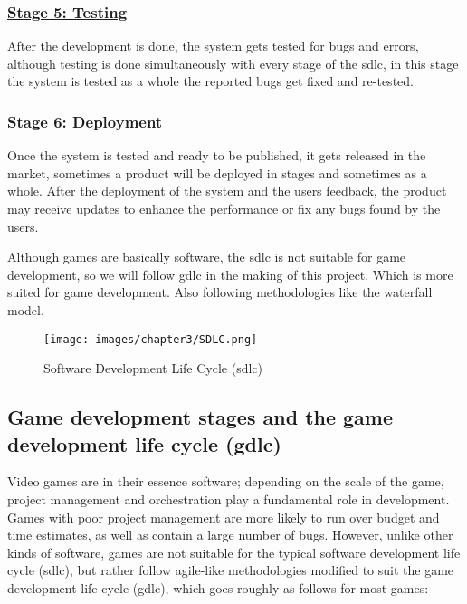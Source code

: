 \documentclass[../main.tex]{subfiles}
\begin{document}
\subsubsection*{\underline{Stage 5: Testing
}} 
After the development is done, the system gets tested for bugs and errors, although testing is done simultaneously with every stage of the \acrshort{sdlc}, in this stage the system is tested as a whole the reported bugs get fixed and re-tested.
\subsubsection*{\underline{Stage 6: Deployment 
}} 
Once the system is tested and ready to be published, it gets released in the market, sometimes a product will be deployed in stages and sometimes as a whole. After the deployment of the system and the users feedback, the product may receive updates to enhance the performance or fix any bugs found by the users. 

Although games are basically software, the \acrshort{sdlc} is not suitable for game development, so we will follow \acrfull{gdlc} in the making of this project. Which is more suited for game development. Also following methodologies like the waterfall model. 

\begin{figure}[!ht]
\centering
\texttt{[image: images/chapter3/SDLC.png]}
\caption{Software Development Life Cycle (\acrshort{sdlc})}
\label{sdlc}
\end{figure}
\newpage
\subsection{Game development stages and the game development life cycle (\acrshort{gdlc})}
Video games are in their essence software; depending on the scale of the game, project management and orchestration play a fundamental role in development. Games with poor project management are more likely to run over budget and time estimates, as well as contain a large number of bugs. However, unlike other kinds of software, games are not suitable for the typical software development life cycle (\acrshort{sdlc}), but rather follow agile-like methodologies modified to suit the game development life cycle (\acrshort{gdlc}), which goes roughly as follows for most games:
\end{document}
